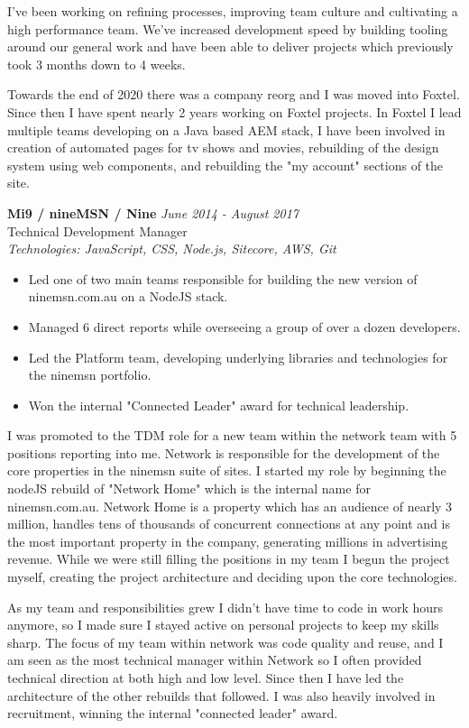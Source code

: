 \documentclass[a4paper,10pt]{article}
\begin{document}
I've been working on refining processes, improving team culture and cultivating a high performance team. We've increased development speed by building tooling around our general work and have been able to deliver projects which previously took 3 months down to 4 weeks.

Towards the end of 2020 there was a company reorg and I was moved into Foxtel. Since then I have spent nearly 2 years working on Foxtel projects. In Foxtel I lead multiple teams developing on a Java based AEM stack, I have been involved in creation of automated pages for tv shows and movies, rebuilding of the design system using web components, and rebuilding the "my account" sections of the site.

\vspace{1em}

\textbf{Mi9 / nineMSN / Nine} \hfill \textit{June 2014 - August 2017} \\
Technical Development Manager \\
\textit{Technologies: JavaScript, CSS, Node.js, Sitecore, AWS, Git}
\begin{itemize}
    \item Led one of two main teams responsible for building the new version of ninemsn.com.au on a NodeJS stack.
    \item Managed 6 direct reports while overseeing a group of over a dozen developers.
    \item Led the Platform team, developing underlying libraries and technologies for the ninemsn portfolio.
    \item Won the internal "Connected Leader" award for technical leadership.
\end{itemize}

I was promoted to the TDM role for a new team within the network team with 5 positions reporting into me. Network is responsible for the development of the core properties in the ninemsn suite of sites. I started my role by beginning the nodeJS rebuild of "Network Home" which is the internal name for ninemsn.com.au. Network Home is a property which has an audience of nearly 3 million, handles tens of thousands of concurrent connections at any point and is the most important property in the company, generating millions in advertising revenue. While we were still filling the positions in my team I begun the project myself, creating the project architecture and deciding upon the core technologies.

As my team and responsibilities grew I didn't have time to code in work hours anymore, so I made sure I stayed active on personal projects to keep my skills sharp. The focus of my team within network was code quality and reuse, and I am seen as the most technical manager within Network so I often provided technical direction at both high and low level. Since then I have led the architecture of the other rebuilds that followed. I was also heavily involved in recruitment, winning the internal "connected leader" award.
\end{document}
